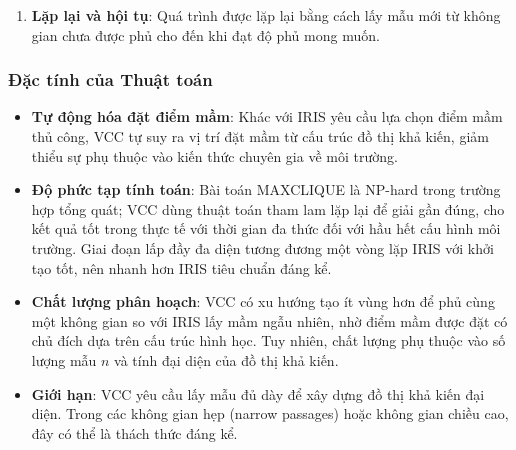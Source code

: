 \begin{enumerate}

\item \textbf{Lặp lại và hội tụ}: Quá trình được lặp lại bằng cách lấy mẫu mới từ không gian chưa được phủ cho đến khi đạt độ phủ mong muốn.


\end{enumerate}

\subsubsection{Đặc tính của Thuật toán}

\begin{itemize}
\item \textbf{Tự động hóa đặt điểm mầm}: Khác với IRIS yêu cầu lựa chọn điểm mầm thủ công, VCC tự suy ra vị trí đặt mầm từ cấu trúc đồ thị khả kiến, giảm thiểu sự phụ thuộc vào kiến thức chuyên gia về môi trường.

\item \textbf{Độ phức tạp tính toán}: Bài toán MAXCLIQUE là NP-hard trong trường hợp tổng quát; VCC dùng thuật toán tham lam lặp lại để giải gần đúng, cho kết quả tốt trong thực tế với thời gian đa thức đối với hầu hết cấu hình môi trường. Giai đoạn lấp đầy đa diện tương đương một vòng lặp IRIS với khởi tạo tốt, nên nhanh hơn IRIS tiêu chuẩn đáng kể.

\item \textbf{Chất lượng phân hoạch}: VCC có xu hướng tạo ít vùng hơn để phủ cùng một không gian so với IRIS lấy mầm ngẫu nhiên, nhờ điểm mầm được đặt có chủ đích dựa trên cấu trúc hình học. Tuy nhiên, chất lượng phụ thuộc vào số lượng mẫu $n$ và tính đại diện của đồ thị khả kiến.

\item \textbf{Giới hạn}: VCC yêu cầu lấy mẫu đủ dày để xây dựng đồ thị khả kiến đại diện. Trong các không gian hẹp (narrow passages) hoặc không gian chiều cao, đây có thể là thách thức đáng kể.
\end{itemize}


